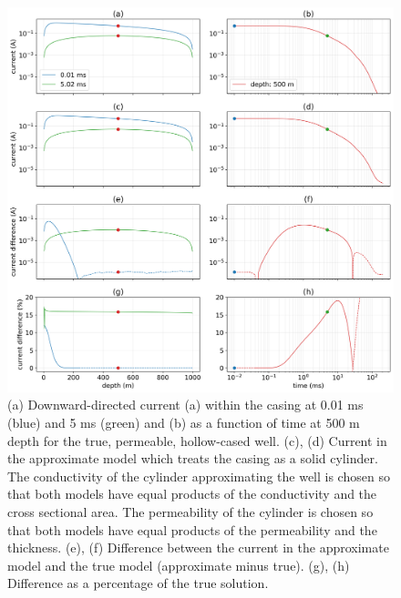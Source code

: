 \begin{figure}
    \begin{center}
    \includegraphics[width=\textwidth]{figures/em_casing/approx_permeable_currents.png}
    \end{center}
\caption{
    (a) Downward-directed current (a) within the casing at 0.01 ms (blue) and 5 ms (green)
    and (b) as a function of time at 500 m depth for the true, permeable, hollow-cased well.
    (c), (d) Current in the approximate model which treats the casing as a solid cylinder.
    The conductivity of the cylinder approximating the well is chosen so that both models have
    equal products of the conductivity and the cross sectional area.
    The permeability of the cylinder is chosen so that both models have equal products of the
    permeability and the thickness.
    (e), (f) Difference between the current in the approximate model and the true model (approximate minus true).
    (g), (h) Difference as a percentage of the true solution.
}
\label{fig:approx_permeable_currents}
\end{figure}



